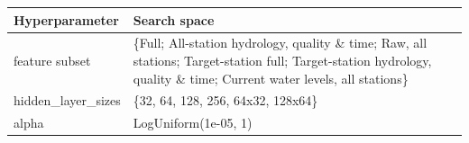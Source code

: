 \begin{tabularx}{\textwidth}{@{}lX@{}}
\toprule
\textbf{Hyperparameter} & \textbf{Search space} \\
\midrule
feature subset & \{Full; All-station hydrology, quality \& time; Raw, all stations; Target-station full; Target-station hydrology, quality \& time; Current water levels, all stations\} \\
\addlinespace
hidden\_layer\_sizes & \{32, 64, 128, 256, 64x32, 128x64\} \\
\addlinespace
alpha & LogUniform(1e-05, 1) \\
\bottomrule
\end{tabularx}
